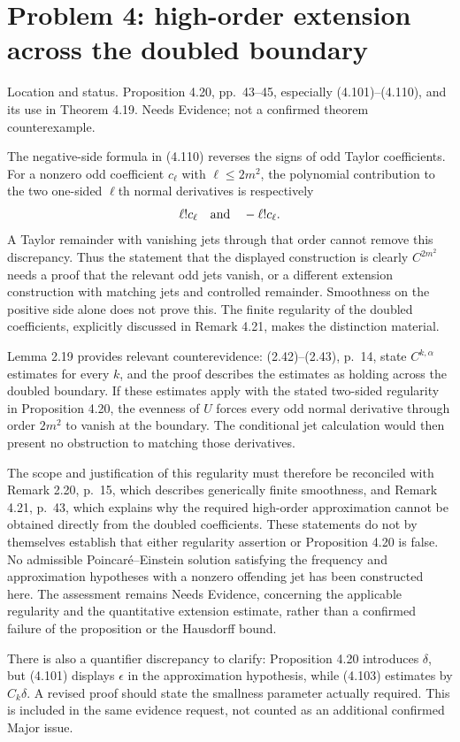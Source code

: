 \documentclass[10pt]{article}
\begin{document}
\section*{Problem 4: high-order extension across the doubled boundary}
Location and status. Proposition 4.20, pp. 43–45, especially (4.101)–(4.110), and its use in Theorem 4.19. Needs Evidence; not a confirmed theorem counterexample.\par
The negative-side formula in (4.110) reverses the signs of odd Taylor coefficients. For a nonzero odd coefficient \(c_\ell\) with \(\ell\leq2m^2\), the polynomial contribution to the two one-sided \(\ell\)th normal derivatives is respectively \[\ell!c_\ell\quad\hbox{and}\quad-\ell!c_\ell.\] A Taylor remainder with vanishing jets through that order cannot remove this discrepancy. Thus the statement that the displayed construction is clearly \(C^{2m^2}\) needs a proof that the relevant odd jets vanish, or a different extension construction with matching jets and controlled remainder. Smoothness on the positive side alone does not prove this. The finite regularity of the doubled coefficients, explicitly discussed in Remark 4.21, makes the distinction material.\par
Lemma 2.19 provides relevant counterevidence: (2.42)–(2.43), p. 14, state \(C^{k,\alpha}\) estimates for every \(k\), and the proof describes the estimates as holding across the doubled boundary. If these estimates apply with the stated two-sided regularity in Proposition 4.20, the evenness of \(U\) forces every odd normal derivative through order \(2m^2\) to vanish at the boundary. The conditional jet calculation would then present no obstruction to matching those derivatives.\par
The scope and justification of this regularity must therefore be reconciled with Remark 2.20, p. 15, which describes generically finite smoothness, and Remark 4.21, p. 43, which explains why the required high-order approximation cannot be obtained directly from the doubled coefficients. These statements do not by themselves establish that either regularity assertion or Proposition 4.20 is false. No admissible Poincaré–Einstein solution satisfying the frequency and approximation hypotheses with a nonzero offending jet has been constructed here. The assessment remains Needs Evidence, concerning the applicable regularity and the quantitative extension estimate, rather than a confirmed failure of the proposition or the Hausdorff bound.\par
There is also a quantifier discrepancy to clarify: Proposition 4.20 introduces \(\delta\), but (4.101) displays \(\epsilon\) in the approximation hypothesis, while (4.103) estimates by \(C_k\delta\). A revised proof should state the smallness parameter actually required. This is included in the same evidence request, not counted as an additional confirmed Major issue.\par
\end{document}
